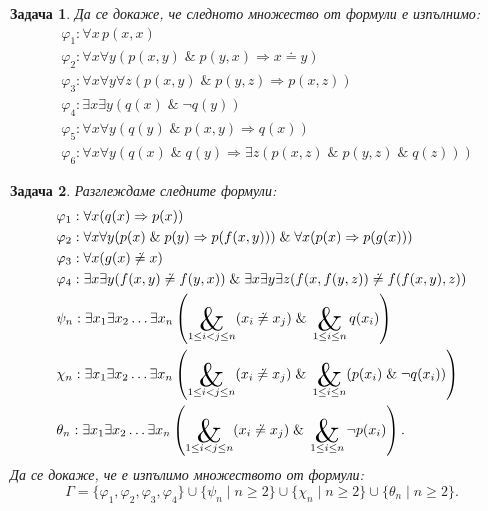 \documentclass[12pt]{article}
\DeclareMathOperator*{\bigand}{\scalerel*{\&}{\sum}}
\newtheorem{problem}{Задача}[section]
\theoremstyle{definition}
\begin{document}
\begin{problem}
Да се докаже, че следното множество от формули е изпълнимо:
\begin{align*}
     & \varphi_1 : \forall x \, p(x, x)                                                                                    \\
     & \varphi_2 : \forall x \forall y (p(x, y) \; \& \; p(y, x) \Rightarrow x \doteq y)                                   \\
     & \varphi_3 : \forall x \forall y \forall z (p(x, y) \; \& \; p(y, z) \Rightarrow p(x, z))                            \\
     & \varphi_4 : \exists x \exists y (q(x) \; \& \; \neg q(y))                                                           \\
     & \varphi_5 : \forall x \forall y (q(y) \; \& \; p(x, y) \Rightarrow q(x))                                            \\
     & \varphi_6 : \forall x \forall y (q(x) \; \& \; q(y) \Rightarrow \exists z (p(x, z) \; \& \; p(y, z) \; \& \; q(z)))
\end{align*}
\end{problem}

\begin{problem}
Разглеждаме следните формули:
\begin{align*}
     & \varphi_1 : \forall x (q(x) \Rightarrow p(x))                                                                                                                                         \\
     & \varphi_2 : \forall x \forall y (p(x) \; \& \; p(y) \Rightarrow p(f(x, y))) \; \& \; \forall x (p(x) \Rightarrow p(g(x)))                                                             \\
     & \varphi_3 : \forall x (g(x) \not \doteq x)                                                                                                                                            \\
     & \varphi_4 : \exists x \exists y (f(x, y) \not \doteq f(y, x)) \; \& \; \exists x \exists y \exists z (f(x, f(y, z)) \not \doteq f(f(x, y), z))                                        \\
     & \psi_n : \exists x_1 \exists x_2 \dots \exists x_n \left( \bigand_{1 \leq i < j \leq n} (x_i \not \doteq x_j) \; \& \; \bigand_{1 \leq i \leq n} q(x_i) \right)                       \\
     & \chi_n : \exists x_1 \exists x_2 \dots \exists x_n \left( \bigand_{1 \leq i < j \leq n} (x_i \not \doteq x_j) \; \& \; \bigand_{1 \leq i \leq n}(p(x_i) \; \& \; \neg q(x_i)) \right) \\
     & \theta_n : \exists x_1 \exists x_2 \dots \exists x_n \left( \bigand_{1 \leq i < j \leq n} (x_i \not \doteq x_j) \; \& \; \bigand_{1 \leq i \leq n} \neg p(x_i) \right).
\end{align*}
Да се докаже, че е изпълимо множеството от формули:
\[
    \Gamma = \{ \varphi_1, \varphi_2, \varphi_3, \varphi_4 \} \cup \{ \psi_n \mid n \geq 2 \} \cup \{ \chi_n \mid n \geq 2 \} \cup \{ \theta_n \mid n \geq 2 \}.
\]
\end{problem}
\end{document}

